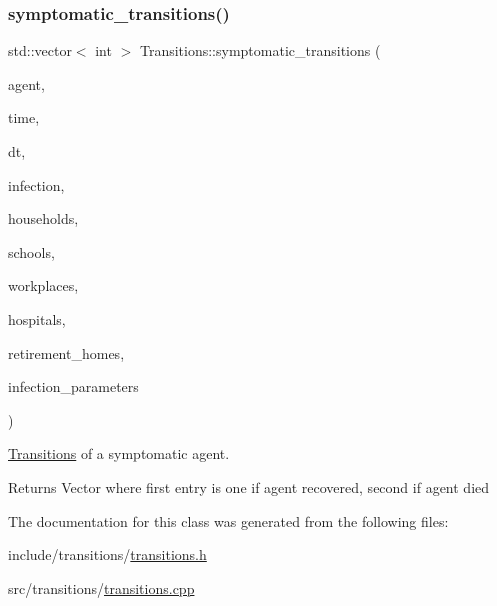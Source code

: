 \subsubsection{\texorpdfstring{symptomatic\+\_\+transitions()}{symptomatic\_transitions()}}
{\footnotesize\ttfamily std\+::vector$<$ int $>$ Transitions\+::symptomatic\+\_\+transitions (\begin{DoxyParamCaption}\item[{\hyperlink{classAgent}{Agent} \&}]{agent,  }\item[{const double}]{time,  }\item[{const double}]{dt,  }\item[{\hyperlink{classInfection}{Infection} \&}]{infection,  }\item[{std\+::vector$<$ \hyperlink{classHousehold}{Household} $>$ \&}]{households,  }\item[{std\+::vector$<$ \hyperlink{classSchool}{School} $>$ \&}]{schools,  }\item[{std\+::vector$<$ \hyperlink{classWorkplace}{Workplace} $>$ \&}]{workplaces,  }\item[{std\+::vector$<$ \hyperlink{classHospital}{Hospital} $>$ \&}]{hospitals,  }\item[{std\+::vector$<$ \hyperlink{classRetirementHome}{Retirement\+Home} $>$ \&}]{retirement\+\_\+homes,  }\item[{const std\+::map$<$ std\+::string, double $>$ \&}]{infection\+\_\+parameters }\end{DoxyParamCaption})}



\hyperlink{classTransitions}{Transitions} of a symptomatic agent. 

\begin{DoxyReturn}{Returns}
Vector where first entry is one if agent recovered, second if agent died 
\end{DoxyReturn}


The documentation for this class was generated from the following files\+:\begin{DoxyCompactItemize}
\item 
include/transitions/\hyperlink{transitions_8h}{transitions.\+h}\item 
src/transitions/\hyperlink{transitions_8cpp}{transitions.\+cpp}\end{DoxyCompactItemize}
